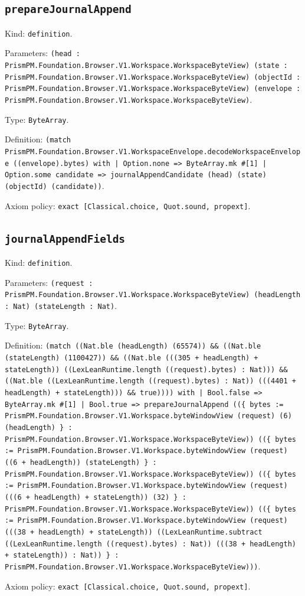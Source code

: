\documentclass[11pt]{article}
\begin{document}
\subsection*{\texttt{prepareJournalAppend}}
\noindent Kind: \texttt{definition}.\par
\noindent Parameters: \texttt{(head : PrismPM.Foundation.Browser.V1.Workspace.WorkspaceByteView) (state : PrismPM.Foundation.Browser.V1.Workspace.WorkspaceByteView) (objectId : PrismPM.Foundation.Browser.V1.Workspace.WorkspaceByteView) (envelope : PrismPM.Foundation.Browser.V1.Workspace.WorkspaceByteView)}.\par
\noindent Type: \texttt{ByteArray}.\par
\noindent Definition: \texttt{(match PrismPM.Foundation.Browser.V1.WorkspaceEnvelope.decodeWorkspaceEnvelope ((envelope).bytes) with | Option.none => ByteArray.mk \#[1] | Option.some candidate => journalAppendCandidate (head) (state) (objectId) (candidate))}.\par
\noindent Axiom policy: \texttt{exact [Classical.choice, Quot.sound, propext]}.\par
\subsection*{\texttt{journalAppendFields}}
\noindent Kind: \texttt{definition}.\par
\noindent Parameters: \texttt{(request : PrismPM.Foundation.Browser.V1.Workspace.WorkspaceByteView) (headLength : Nat) (stateLength : Nat)}.\par
\noindent Type: \texttt{ByteArray}.\par
\noindent Definition: \texttt{(match ((Nat.ble (headLength) (65574)) \&\& ((Nat.ble (stateLength) (1100427)) \&\& ((Nat.ble (((305 + headLength) + stateLength)) ((LexLeanRuntime.length ((request).bytes) : Nat))) \&\& ((Nat.ble ((LexLeanRuntime.length ((request).bytes) : Nat)) (((4401 + headLength) + stateLength))) \&\& true)))) with | Bool.false => ByteArray.mk \#[1] | Bool.true => prepareJournalAppend ((\{ bytes := PrismPM.Foundation.Browser.V1.Workspace.byteWindowView (request) (6) (headLength) \} : PrismPM.Foundation.Browser.V1.Workspace.WorkspaceByteView)) ((\{ bytes := PrismPM.Foundation.Browser.V1.Workspace.byteWindowView (request) ((6 + headLength)) (stateLength) \} : PrismPM.Foundation.Browser.V1.Workspace.WorkspaceByteView)) ((\{ bytes := PrismPM.Foundation.Browser.V1.Workspace.byteWindowView (request) (((6 + headLength) + stateLength)) (32) \} : PrismPM.Foundation.Browser.V1.Workspace.WorkspaceByteView)) ((\{ bytes := PrismPM.Foundation.Browser.V1.Workspace.byteWindowView (request) (((38 + headLength) + stateLength)) ((LexLeanRuntime.subtract ((LexLeanRuntime.length ((request).bytes) : Nat)) (((38 + headLength) + stateLength)) : Nat)) \} : PrismPM.Foundation.Browser.V1.Workspace.WorkspaceByteView)))}.\par
\noindent Axiom policy: \texttt{exact [Classical.choice, Quot.sound, propext]}.\par
\end{document}
